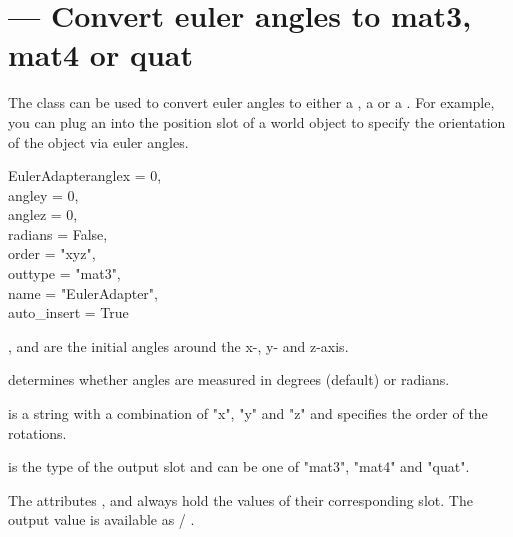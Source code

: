 
\section{ ---
         Convert euler angles to mat3, mat4 or quat}

The  class can be used to convert euler angles
to either a , a  or a .
For example, you can plug an  into the position
slot of a world object to specify the orientation of the object via
euler angles.

\begin{classdesc}{EulerAdapter}{anglex = 0,\\ 
                                angley = 0,\\
                                anglez = 0,\\
                                radians = False,\\
                                order = "xyz",\\
                                outtype = "mat3",\\
                                name = "EulerAdapter",\\
                                auto_insert = True}

,  and  are the initial angles around
the x-, y- and z-axis.

 determines whether angles are measured in degrees (default)
or radians.

 is a string with a combination of "x", "y" and "z" and specifies 
the order of the rotations.

 is the type of the output slot and can be one of "mat3",
"mat4" and "quat".
\end{classdesc}

The attributes ,  and  always hold
the values of their corresponding slot. The output value is available
as  / .